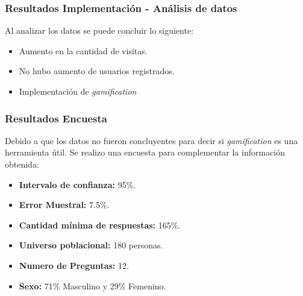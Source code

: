 \documentclass[10pt, compress]{beamer}
\begin{document}
\begin{frame}
 \frametitle{Resultados Implementación - Análisis de datos}

Al analizar los datos se puede concluir lo siguiente:

\begin{itemize}[<+- | alert@+>]
 \item Aumento en la cantidad de visitas.
 \item No hubo aumento de usuarios registrados.
 \item Implementación de \emph{gamification} \color{red}{no fue efectiva.}
\end{itemize}

\begin{table}[h]
\footnotesize
\centering

\caption{Datos Pre y Post implementación.}
\label{tab:tam_empresa}
\end{table}

\end{frame}

\begin{frame}
 \frametitle{Resultados Encuesta}

Debido a que los datos no fueron concluyentes para decir si \emph{gamification} es una herramienta útil.
Se realizo una encuesta para complementar la información obtenida:

\begin{itemize}
    \item \textbf{Intervalo de confianza:} 95\%.
    \item \textbf{Error Muestral:} 7.5\%.
    \item \textbf{Cantidad mínima de respuestas:} 165\%.
    \item \textbf{Universo poblacional:} 180 personas.
    \item \textbf{Numero de Preguntas:} 12.
    \item \textbf{Sexo:} 71\% Masculino y 29\% Femenino.
\end{itemize}

\end{frame}
\end{document}
